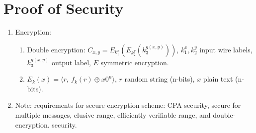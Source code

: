 \documentclass[11pt, a4paper]{article}
\begin{document}
\section{Proof of Security} \cite{proof_of_security}

\begin{enumerate}
    \item Encryption:
        \begin{enumerate}
            \item Double encryption: 
            $C_{x,y} = E_{k_1^x}\left(E_{k_2^y}(k_3^{g(x,y)})\right)$, $k_1^x, k_2^y$ input wire labels, $k_3^{g(x,y)}$ output label, $E$ symmetric encryption.
            \item $E_k(x)=\langle r,\ f_k(r)\oplus x0^n\rangle$, $r$ random string (n-bits), $x$ plain text (n-bits).
        \end{enumerate}
    \item Note: requirements for secure encryption scheme: CPA security, secure 
    for multiple messages, elusive range, efficiently verifiable range, and double-encryption.
security.
\end{enumerate}






\end{document}

